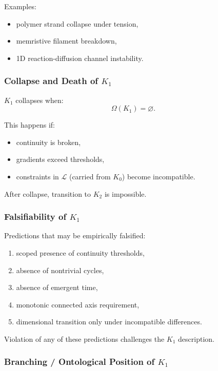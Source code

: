 Examples:
\begin{itemize}
    \item polymer strand collapse under tension,
    \item memristive filament breakdown,
    \item 1D reaction-diffusion channel instability.
\end{itemize}

\subsubsection{Collapse and Death of \texorpdfstring{$K_1$}{K_1}}

$K_1$ collapses when:
\[
\Omega(K_1) = \varnothing.
\]

This happens if:
\begin{itemize}
    \item continuity is broken,
    \item gradients exceed thresholds,
    \item constraints in $\mathcal{L}$ (carried from $K_0$) become
          incompatible.
\end{itemize}

After collapse, transition to $K_2$ is impossible.

\subsubsection{Falsifiability of \texorpdfstring{$K_1$}{K_1}}

Predictions that may be empirically falsified:
\begin{enumerate}
    \item scoped presence of continuity thresholds,
    \item absence of nontrivial cycles,
    \item absence of emergent time,
    \item monotonic connected axis requirement,
    \item dimensional transition only under incompatible differences.
\end{enumerate}

Violation of any of these predictions challenges the $K_1$ description.

\subsubsection{Branching / Ontological Position of \texorpdfstring{$K_1$}{K_1}}


